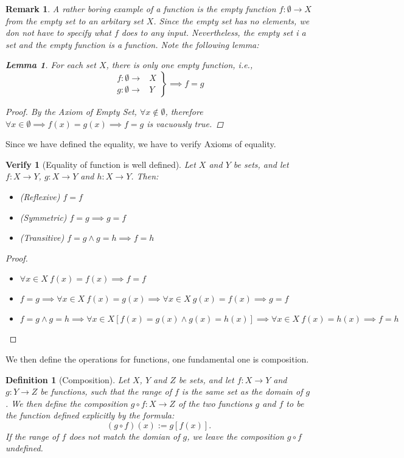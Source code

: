 \documentclass[a4paper]{book}
\newtheorem*{proof}{\textit{Proof.}}
\theoremstyle{break}
\newtheorem{definition}{Definition}[section]
\newtheorem{lemma}{Lemma}[section]
\newtheorem{remark}{Remark}[section]
\newtheorem*{verify}{Verify}
\begin{document}
			\begin{remark}
				A rather boring example of a function is the empty function $f:\emptyset\to X$ from the empty set to an arbitary set $X$. Since the empty set has no elements, we don not have to specify what $f$ does to any input. Nevertheless, the empty set i a set and the empty function is a function. Note the following lemma:
				\begin{lemma}
					For each set $X$, there is only one empty function, \textit{i.e.,}
					$$
					\left.
					\begin{aligned}
						f:\emptyset\to&X\\
						g:\emptyset\to&Y
					\end{aligned}
					\right\rbrace \implies f=g
					$$
				\end{lemma}
				\begin{proof}
					By the Axiom of Empty Set, $\forall x\notin\emptyset$, therefore $\forall x\in\emptyset\!\implies\!f(x)=g(x)\!\implies\!f=g$ is vacuously true.
				\end{proof}
			\end{remark}
			Since we have defined the equality, we have to verify Axioms of equality.
			\begin{verify}[Equality of function is well defined]
				Let $X$ and $Y$ be sets, and let $f:X\to Y$, $g:X\to Y$ and $h:X\to Y$. Then:
				\begin{itemize}
					\item (Reflexive) $f=f$
					\item (Symmetric) $f=g\implies g=f$
					\item (Transitive) $f=g\land g=h\implies f=h$
				\end{itemize}
			\end{verify}
			\begin{proof}~
				\begin{itemize}
					\item $\forall x\in X~f(x)=f(x)\implies f=f$
					\item $f=g\implies\forall x\in X~f(x)=g(x)\implies\forall x\in X~g(x)=f(x)\implies g=f$
					\item $f=g\land g=h\implies\forall x\in X[f(x)=g(x)\land g(x)=h(x)]\implies\forall x\in X~f(x)=h(x)\implies f=h$
				\end{itemize}
			\end{proof}
			We then define the operations for functions, one fundamental one is composition.
			\begin{definition}[Composition]
				Let $X$, $Y$ and $Z$ be sets, and let $f:X\to Y$ and $g:Y\to Z$ be functions, such that the range of $f$ is the same set as the domain of $g$. We then define the composition $g\circ f:X\to Z$ of the two functions $g$ and $f$ to be the function defined explicitly by the formula:
				$$(g\circ f)(x):=g[f(x)].$$
				If the range of $f$ does not match the domian of $g$, we leave the composition $g\circ f$ undefined.
			\end{definition}
\end{document}
